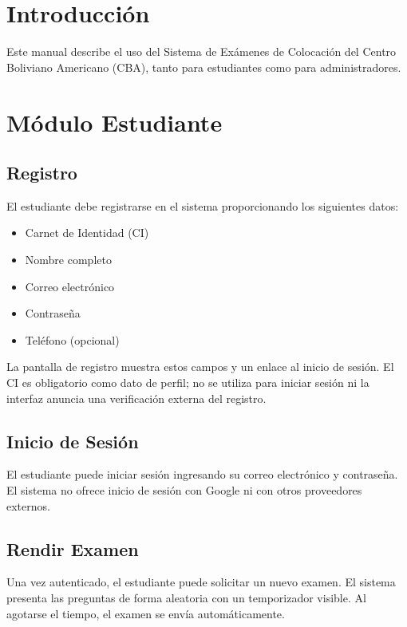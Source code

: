 \section{Introducción}

Este manual describe el uso del Sistema de Exámenes de Colocación del Centro Boliviano Americano (CBA), tanto para estudiantes como para administradores.

\section{Módulo Estudiante}

\subsection{Registro}

El estudiante debe registrarse en el sistema proporcionando los siguientes datos:

\begin{itemize}
    \item Carnet de Identidad (CI)
    \item Nombre completo
    \item Correo electrónico
    \item Contraseña
    \item Teléfono (opcional)
\end{itemize}

La pantalla de registro muestra estos campos y un enlace al inicio de sesión. El CI es obligatorio como dato de perfil; no se utiliza para iniciar sesión ni la interfaz anuncia una verificación externa del registro.

\subsection{Inicio de Sesión}

El estudiante puede iniciar sesión ingresando su correo electrónico y contraseña. El sistema no ofrece inicio de sesión con Google ni con otros proveedores externos.

\subsection{Rendir Examen}

Una vez autenticado, el estudiante puede solicitar un nuevo examen. El sistema presenta las preguntas de forma aleatoria con un temporizador visible. Al agotarse el tiempo, el examen se envía automáticamente.

